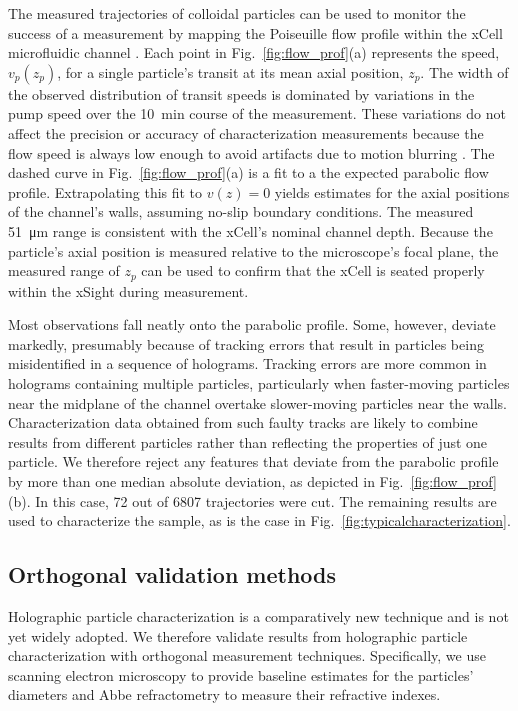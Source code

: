 \documentclass[journal=langd5,manuscript=article]{achemso}
\begin{document}
The measured trajectories of colloidal particles 
can be used to monitor
the success of a measurement by mapping the
Poiseuille flow profile within the xCell microfluidic
channel \cite{cheong2009flow,cheong10a}.
Each point in Fig.~\ref{fig:flow_prof}(a)
represents the speed, $v_p(z_p)$, for a single
particle's transit at its mean axial position, $z_p$.
The width of the observed distribution of transit speeds
is dominated by variations in the pump speed over
the \SI{10}{\minute} course of the measurement.
These variations do not affect the precision or accuracy
of characterization measurements because 
the flow speed is always low enough to avoid artifacts
due to motion blurring \cite{cheong2009flow,dixon2011holographic}.
The dashed curve in Fig.~\ref{fig:flow_prof}(a) is a fit to a
the expected parabolic flow profile. 
Extrapolating this fit to $v(z) = 0$ yields estimates
for the axial positions of the channel's walls, assuming
no-slip boundary conditions.
The measured \SI{51}{\um} range is consistent with
the xCell's nominal channel depth.
Because the particle's axial position is measured
relative to the microscope's focal plane,
the measured range of $z_p$
can be used to confirm that the xCell is seated
properly within the xSight during measurement.

Most observations fall neatly onto the parabolic profile.
Some, however, deviate markedly, presumably because
of tracking errors that result in particles being
misidentified in a sequence of holograms.
Tracking errors are more common in holograms
containing multiple particles, particularly when
faster-moving particles near the midplane of the
channel overtake slower-moving particles near
the walls.
Characterization data obtained from such faulty tracks
are likely to combine results from different particles
rather than reflecting the properties of just one particle.
We therefore reject any features that deviate from
the parabolic profile by more than one median absolute deviation,
as depicted in Fig.~\ref{fig:flow_prof}(b).
In this case, \num{72} out of \num{6807} trajectories
were cut.
The remaining results are used
to characterize the sample, as is the case
in Fig.~\ref{fig:typicalcharacterization}.

\subsection{Orthogonal validation methods}
\label{sec:orthogonalmethods}

Holographic particle characterization is a comparatively new technique
and is not yet widely adopted. We therefore validate results from
holographic particle characterization with 
orthogonal measurement techniques.
Specifically, we use scanning electron microscopy to provide baseline estimates for the
particles' diameters and Abbe refractometry to measure their refractive indexes.
\end{document}
